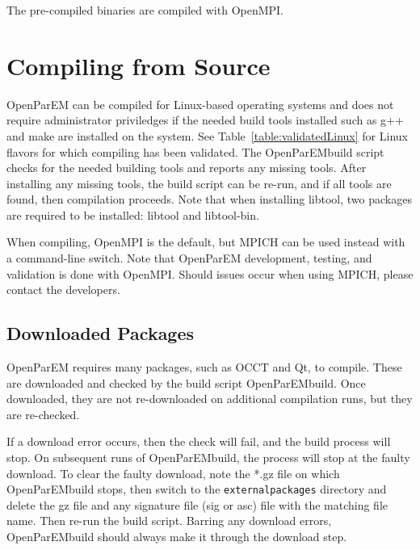 \documentclass[titlepage]{article}
\renewcommand\_{\textunderscore\linebreak[1]}
\begin{document}
\noindent The pre-compiled binaries are compiled with OpenMPI.

\section{Compiling from Source}

OpenParEM can be compiled for Linux-based operating systems and does not require administrator priviledges if the needed build tools installed such as g++ and make are installed on the system.  See Table~\ref{table:validatedLinux} for Linux flavors for which compiling has been validated.  The OpenParEM\_build script checks for the needed building tools and reports any missing tools.  After installing any missing tools, the build script can be re-run, and if all tools are found, then compilation proceeds.
Note that when installing libtool, two packages are required to be installed: libtool and libtool-bin.

When compiling, OpenMPI is the default, but MPICH can be used instead with a command-line switch.  Note that OpenParEM development, testing, and validation is done with OpenMPI.  Should issues occur when using MPICH, please contact the developers.

\subsection{Downloaded Packages}

OpenParEM requires many packages, such as OCCT and Qt, to compile.  These are downloaded and checked by the build script OpenParEM\_build.  Once downloaded, they are not re-downloaded on additional compilation runs, but they are re-checked.

If a download error occurs, then the check will fail, and the build process will stop.  On subsequent runs of OpenParEM\_build, the process will stop at the faulty download.  To clear the faulty download, note the *.gz file on which OpenParEM\_build stops, then switch to the \texttt{external\_packages} directory and delete the gz file and any signature file (sig or asc) file with the matching file name.  Then re-run the build script.  Barring any download errors, OpenParEM\_build should always make it through the download step.
\end{document}
